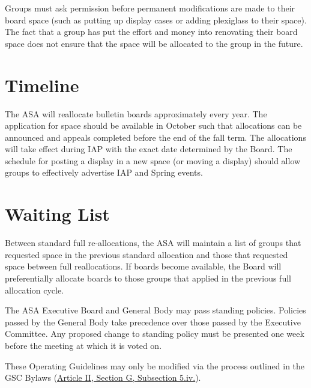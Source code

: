 \documentclass[12pt]{article}
\begin{document}
Groups must ask permission before permanent modifications are made to their board space (such as
putting up display cases or adding plexiglass to their space). The fact that a group has put the effort
and money into renovating their board space does not ensure that the space will be allocated to the
group in the future.

\section{Timeline}
The ASA will reallocate bulletin boards approximately every year. The application for space should be
available in October such that allocations can be announced and appeals completed before the end of
the fall term. The allocations will take effect during IAP with the exact date determined by the Board.
The schedule for posting a display in a new space (or moving a display) should allow groups to
effectively advertise IAP and Spring events.

\section{Waiting List}
Between standard full re-allocations, the ASA will maintain a list of groups that requested space in the
previous standard allocation and those that requested space between full reallocations. If boards
become available, the Board will preferentially allocate boards to those groups that applied in the
previous full allocation cycle.

\newpage

The ASA Executive Board and General Body may pass standing policies. Policies passed by the General
Body take precedence over those passed by the Executive Committee. Any proposed change to
standing policy must be presented one week before the meeting at which it is voted on.

These Operating Guidelines may only be modified via the process outlined in the GSC Bylaws
(\hyperref[bylaws:5iv]{Article II, Section G, Subsection 5.iv.}).

\newpage

\label{app:asa_org}
\end{document}
